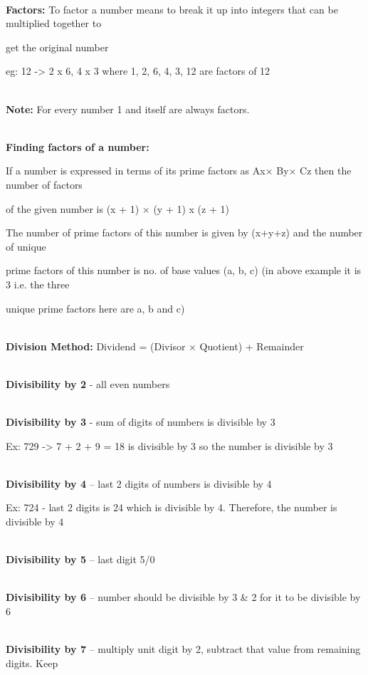 \documentclass[
]{article}
\begin{document}
\textbf{\\  Factors:} To factor a number means to break it up into integers
that can be multiplied together to


get the original number

eg: 12 -\textgreater{} 2 x 6, 4 x 3 where 1, 2, 6, 4, 3, 12 are factors
of 12

\textbf{\\  Note:} For every number 1 and itself are always factors.

\textbf{\\  Finding factors of a number:}

If a number is expressed in terms of its prime factors as Ax× By× Cz
then the number of factors


of the given number is (x + 1) × (y + 1) x (z + 1)


The number of prime factors of this number is given by (x+y+z) and the
number of unique

prime factors of this number is no. of base values (a, b, c) (in above
example it is 3 i.e. the three


unique prime factors here are a, b and c)

\textbf{\\ Division Method:} Dividend = (Divisor × Quotient) + Remainder



\textbf{\\ Divisibility by 2} - all even numbers

\textbf{\\ Divisibility by 3} - sum of digits of numbers is divisible by 3

Ex: 729 -\textgreater{} 7 + 2 + 9 = 18 is divisible by 3 so the number
is divisible by 3

\textbf{\\ Divisibility by 4} -- last 2 digits of numbers is divisible by 4

Ex: 724 - last 2 digits is 24 which is divisible by 4. Therefore, the
number is divisible by 4

\textbf{\\ Divisibility by 5} -- last digit 5/0

\textbf{\\ Divisibility by 6} -- number should be divisible by 3 \& 2 for
it to be divisible by 6


\textbf{\\ Divisibility by 7} -- multiply unit digit by 2, subtract that
value from remaining digits. Keep
\end{document}
